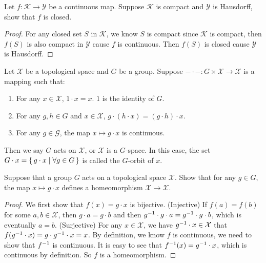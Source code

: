 \documentclass[./main.tex]{subfiles}
\begin{document}
\begin{theorem}
  Let $f : \mathcal{K} \rightarrow \mathcal{Y}$ be a continuous map. Suppose
  $\mathcal{K}$ is compact and $\mathcal{Y}$ is Hausdorff, show that
  $f$ is closed.
\end{theorem}
\begin{proof}
  For any closed set $S$ in $\mathcal{K}$, we know $S$ is compact since $\mathcal{K}$
  is compact, then $f(S)$ is also compact in $\mathcal{Y}$ cause $f$ is continuous.
  Then $f(S)$ is closed cause $\mathcal{Y}$ is Hausdorff.
\end{proof}

\begin{definition}
  Let $\mathcal{X}$ be a topological space and $G$ be a group.
  Suppose $- \cdot - : G \times \mathcal{X} \rightarrow \mathcal{X}$ is a mapping
  such that:
  \begin{enumerate}
    \item For any $x \in \mathcal{X}$, $1 \cdot x = x$. $1$ is the identity of $G$.
    \item For any $g, h \in G$ and $x \in \mathcal{X}$, $g \cdot (h \cdot x) = (g \cdot h) \cdot x$.
    \item For any $g \in \mathcal{G}$, the map $x \mapsto g \cdot x$ is continuous.
  \end{enumerate}

  Then we say $G$ acts on $\mathcal{X}$, or $\mathcal{X}$ is a $G$-space.
  In this case, the set $G \cdot x = \set{ g \cdot x | \forall g \in G }$
  is called the $G$-orbit of $x$.
\end{definition}

\begin{theorem}
  \label{theorem:1.4}
  Suppose that a group $G$ acts on a topological space $\mathcal{X}$.
  Show that for any $g \in G$, the map $x \mapsto g \cdot x$ defines a homeomorphism
  $\mathcal{X} \rightarrow \mathcal{X}$.
\end{theorem}
\begin{proof}
  We first show that $f(x) = g \cdot x$ is bijective. 
  (Injective) If $f(a) = f(b)$ for some $a, b \in \mathcal{X}$, then $g \cdot a = g \cdot b$
  and then $g^{-1} \cdot g \cdot a = g^{-1} \cdot g \cdot b$, which is eventually
  $a = b$.
  (Surjective) For any $x \in \mathcal{X}$, we have $g^{-1} \cdot x \in \mathcal{X}$
  that $f(g^{-1} \cdot x) = g \cdot g^{-1} \cdot x = x$.
  By definition, we know $f$ is continuous, we need to show that $f^{-1}$ is continuous.
  It is easy to see that $f^{-1}(x) = g^{-1} \cdot x$, which is continuous by definition.
  So $f$ is a homeomorphism.
\end{proof}
\end{document}
